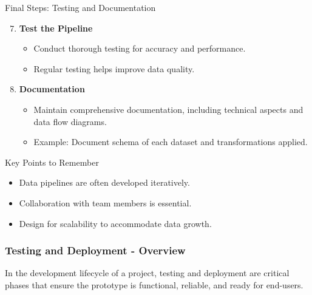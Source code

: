 \documentclass[aspectratio=169]{beamer}
\begin{document}
\begin{frame}{Final Steps: Testing and Documentation}
    \begin{enumerate}
        \setcounter{enumi}{6}
        \item \textbf{Test the Pipeline}
        \begin{itemize}
            \item Conduct thorough testing for accuracy and performance.
            \item Regular testing helps improve data quality.
        \end{itemize}
        
        \item \textbf{Documentation}
        \begin{itemize}
            \item Maintain comprehensive documentation, including technical aspects and data flow diagrams.
            \item Example: Document schema of each dataset and transformations applied.
        \end{itemize}
    \end{enumerate}

    \begin{block}{Key Points to Remember}
        \begin{itemize}
            \item Data pipelines are often developed iteratively.
            \item Collaboration with team members is essential.
            \item Design for scalability to accommodate data growth.
        \end{itemize}
    \end{block}
\end{frame}

\begin{frame}[fragile]
    \frametitle{Testing and Deployment - Overview}
    In the development lifecycle of a project, testing and deployment are critical phases that ensure the prototype is functional, reliable, and ready for end-users. 
\end{frame}
\end{document}
